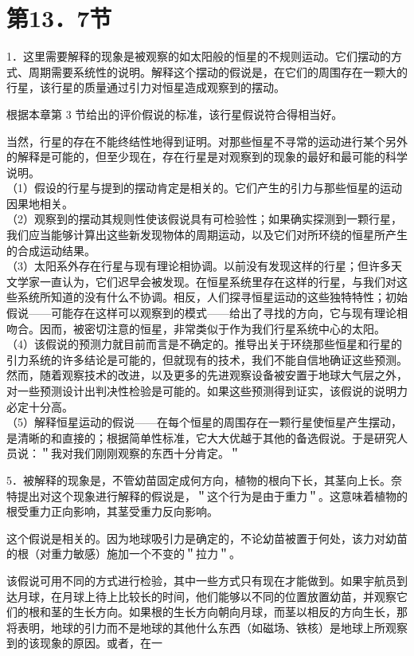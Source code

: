 \section*{第13．7节}
1．这里需要解释的现象是被观察的如太阳般的恒星的不规则运动。它们摆动的方式、周期需要系统性的说明。解释这个摆动的假说是，在它们的周围存在一颗大的行星，该行星的质量通过引力对恒星造成观察到的摆动。

根据本章第 3 节给出的评价假说的标准，该行星假说符合得相当好。

当然，行星的存在不能终结性地得到证明。对那些恒星不寻常的运动进行某个另外的解释是可能的，但至少现在，存在行星是对观察到的现象的最好和最可能的科学说明。\\
（1）假设的行星与提到的摆动肯定是相关的。它们产生的引力与那些恒星的运动因果地相关。\\
（2）观察到的摆动其规则性使该假说具有可检验性；如果确实探测到一颗行星，我们应当能够计算出这些新发现物体的周期运动，以及它们对所环绕的恒星所产生的合成运动结果。\\
（3）太阳系外存在行星与现有理论相协调。以前没有发现这样的行星；但许多天文学家一直认为，它们迟早会被发现。在恒星系统里存在这样的行星，与我们对这些系统所知道的没有什么不协调。相反，人们探寻恒星运动的这些独特特性；初始假说——可能存在这样可以观察到的模式——给出了寻找的方向，它与现有理论相吻合。因而，被密切注意的恒星，非常类似于作为我们行星系统中心的太阳。\\
（4）该假说的预测力就目前而言是不确定的。推导出关于环绕那些恒星和行星的引力系统的许多结论是可能的，但就现有的技术，我们不能自信地确证这些预测。然而，随着观察技术的改进，以及更多的先进观察设备被安置于地球大气层之外，对一些预测设计出判决性检验是可能的。如果这些预测得到证实，该假说的说明力必定十分高。\\
（5）解释恒星运动的假说——在每个恒星的周围存在一颗行星使恒星产生摆动，是清晰的和直接的；根据简单性标准，它大大优越于其他的备选假说。于是研究人员说：＂我对我们刚刚观察的东西十分肯定。＂

5．被解释的现象是，不管幼苗固定成何方向，植物的根向下长，其茎向上长。奈特提出对这个现象进行解释的假说是，＂这个行为是由于重力＂。这意味着植物的根受重力正向影响，其茎受重力反向影响。

这个假说是相关的。因为地球吸引力是确定的，不论幼苗被置于何处，该力对幼苗的根（对重力敏感）施加一个不变的＂拉力＂。

该假说可用不同的方式进行检验，其中一些方式只有现在才能做到。如果宇航员到达月球，在月球上待上比较长的时间，他们能够以不同的位置放置幼苗，并观察它们的根和茎的生长方向。如果根的生长方向朝向月球，而茎以相反的方向生长，那将表明，地球的引力而不是地球的其他什么东西（如磁场、铁核）是地球上所观察到的该现象的原因。或者，在一

